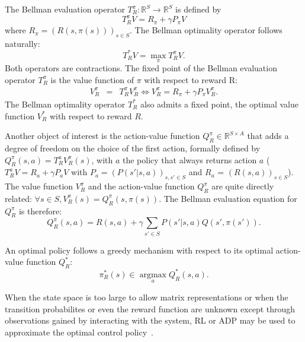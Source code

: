 \documentclass[smallextended]{svjour3}
\newcommand{\argmax}{\operatorname*{argmax}} %
\begin{document}
The Bellman evaluation operator $T^\pi_R: \mathbb{R}^{S} \rightarrow  \mathbb{R}^{S}$ is defined by
\begin{equation}
  T^{\pi}_RV = R_\pi + \gamma P_\pi V
  \end{equation}
where $R_\pi = (R(s,\pi(s)))_{s\in S}$. The Bellman optimality operator follows naturally:
\begin{equation}
  T^*_RV = \max_\pi T^\pi_RV.
\end{equation}
  Both operators are contractions. The fixed point of the Bellman evaluation operator $T^\pi_R$ is the value function of $\pi$ with respect to reward R:
  \begin{eqnarray}
    V^\pi_R &=& T^\pi_R V^\pi_R \Leftrightarrow V^\pi_R = R_\pi + \gamma P_\pi V^\pi_R.
  \end{eqnarray}
The Bellman optimality operator $T^*_R$ also admits a fixed point, the optimal value function $V_R^*$ with respect to reward $R$.

Another object of interest is the action-value function $Q^\pi_R\in\mathbb{R}^{S\times A}$ that adds a degree of freedom on the choice of the first action, formally defined by $Q^\pi_R(s,a) = T^a_RV^\pi_R(s)$, with $a$ the policy that always returns action $a$ ($T^a_RV = R_a + \gamma P_a V$ with $P_a = (P(s'|s,a))_{s,s' \in S}$ and $R_a$ = $(R(s,a))_{s\in S}$). The value function $V^\pi_R$ and the action-value function $Q^\pi_R$ are quite directly related: $\forall s \in S, V^\pi_R(s) = Q^\pi_R(s,\pi(s))$. The Bellman evaluation equation for $Q^\pi_R$ is therefore:
\begin{equation}
  Q^\pi_R(s,a) = R(s,a) + \gamma \sum_{s'\in S}P(s'|s,a) Q(s',\pi(s')).
  \label{eq:bellman1}
\end{equation}

An optimal policy follows a greedy mechanism with respect to its optimal action-value function $Q^*_R$:
\begin{equation}
  \label{eq:greedy}
  \pi^*_R(s)\in\argmax_aQ^*_R(s,a).
\end{equation}

When the state space is too large to allow matrix representations or when the transition probabilites or even the reward function are unknown except through observations gained by interacting with the system, RL or ADP may be used to approximate the optimal control policy~\cite{sutton1998reinforcement}.
\end{document}
